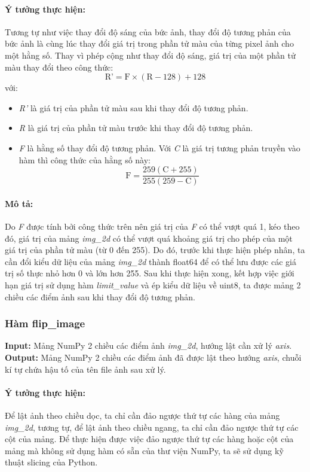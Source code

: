\documentclass{article}
\begin{document}
\paragraph{Ý tưởng thực hiện:} Tương tự như việc thay đổi độ sáng của bức ảnh, thay đổi độ tương phản của bức ảnh là cùng lúc thay đổi giá trị trong phần tử màu của từng pixel ảnh cho một hằng số. Thay vì phép cộng như thay đổi độ sáng, giá trị của một phần tử màu thay đổi theo công thức:
\[ \text{R'} = \text{F} \times (\text{R}-128) + 128 \]
với:
\begin{itemize}
    \item \textit{R'} là giá trị của phần tử màu sau khi thay đổi độ tương phản.
    \item \textit{R} là giá trị của phần tử màu trước khi thay đổi độ tương phản.
    \item \textit{F} là hằng số thay đổi độ tương phản. Với \textit{C} là giá trị tương phản truyền vào hàm thì công thức của hằng số này:
    \[ \text{F} = \frac{259(\text{C}+255)}{255(259-\text{C})} \]
\end{itemize}

\paragraph{Mô tả:} Do \textit{F} được tính bởi công thức trên nên giá trị của \textit{F} có thể vượt quá 1, kéo theo đó, giá trị của mảng \textit{img\_2d} có thể vượt quá khoảng giá trị cho phép của một giá trị của phần tử màu (từ 0 đến 255). Do đó, trước khi thực hiện phép nhân, ta cần đổi kiểu dữ liệu của mảng \textit{img\_2d} thành float64 để có thể lưu được các giá trị số thực nhỏ hơn 0 và lớn hơn 255. Sau khi thực hiện xong, kết hợp việc giới hạn giá trị sử dụng hàm \textit{limit\_value} và ép kiểu dữ liệu về uint8, ta được mảng 2 chiều các điểm ảnh sau khi thay đổi độ tương phản.

\subsubsection{Hàm flip\_image}
\textbf{Input:} Mảng NumPy 2 chiều các điểm ảnh \textit{img\_2d}, hướng lật cần xử lý \textit{axis}. \\
\textbf{Output:} Mảng NumPy 2 chiều các điểm ảnh đã được lật theo hướng \textit{axis}, chuỗi kí tự chứa hậu tố của tên file ảnh sau xử lý.

\paragraph{Ý tưởng thực hiện:} Để lật ảnh theo chiều dọc, ta chỉ cần đảo ngược thứ tự các hàng của mảng \textit{img\_2d}, tương tự, để lật ảnh theo chiều ngang, ta chỉ cần đảo ngược thứ tự các cột của mảng. Để thực hiện được việc đảo ngược thứ tự các hàng hoặc cột của mảng mà không sử dụng hàm có sẵn của thư viện NumPy, ta sẽ sử dụng kỹ thuật slicing của Python.
\end{document}
